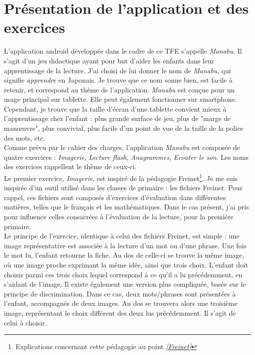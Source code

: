 \section{Présentation de l'application et des exercices}
L'application android développée dans le cadre de ce TFE s'appelle \textit{Manabu}. Il s'agit d'un jeu didactique ayant pour but d'aider les enfants dans leur apprentissage de la lecture. J'ai choisi de lui donner le nom de \textit{Manabu}, qui signifie \textit{apprendre} en Japonais. Je trouve que ce nom sonne bien, est facile à retenir, et correspond au thème de l'application. 
\textit{Manabu} est conçue pour un usage principal sur tablette. Elle peut également fonctionner sur smartphone. Cependant, je trouve que la taille d'écran d'une tablette convient mieux à l'apprentissage chez l'enfant : plus grande surface de jeu, plus de "marge de manœuvre", plus convivial, plus facile d'un point de vue de la taille de la police des mots, etc.\\

Comme prévu par le cahier des charges, l'application \textit{Manabu} est composée de quatre exercices : \textit{Imagerie}, \textit{Lecture flash}, \textit{Anagrammes}, \textit{Ecouter le son}. Les noms des exercices rappellent le thème de ceux-ci.\\

Le premier exercice, \textit{Imagerie}, est inspiré de la pédagogie Freinet\footnote{Explications concernant cette pédagogie au point \textit{\ref{Freinet}}}. Je me suis inspirée d'un outil utilisé dans les classes de primaire : les fichiers Freinet. Pour rappel, ces fichiers sont composés d'exercices d'évaluation dans différentes matières, telles que le français et les mathématiques. Dans le cas présent, j'ai pris pour influence celles consacrées à l'évaluation de la lecture, pour la première primaire.\\

Le principe de l'exercice, identique à celui des fichiers Freinet, est simple : une image représentative est associée à la lecture d'un mot ou d'une phrase. Une fois le mot lu, l'enfant retourne la fiche. Au dos de celle-ci se trouve la même image, où une image proche exprimant la même idée, ainsi que trois choix. L'enfant doit choisir parmi ces trois choix lequel correspond à ce qu'il a lu précédemment, en s'aidant de l'image. Il existe également une version plus compliquée, basée sur le principe de discrimination. Dans ce cas, deux mots/phrases sont présentées à l'enfant, accompagnés de deux images. Au dos se trouvera alors une troisième image, représentant le choix différent des deux lus précédemment. Il s'agit de celui à choisir.\\

